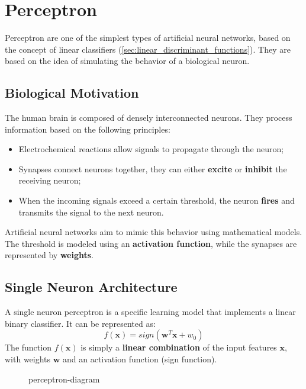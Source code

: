 \section{Perceptron}
Perceptron are one of the simplest types of artificial neural networks, based on the concept of linear classifiers (\ref{sec:linear_discriminant_functions}).
They are based on the idea of simulating the behavior of a biological neuron.
\subsection{Biological Motivation}
The human brain is composed of densely interconnected neurons. They process information based on the following principles:
\begin{itemize}
    \item Electrochemical reactions allow signals to propagate through the neuron;
    \item Synapses connect neurons together, they can either \textbf{excite} or \textbf{inhibit} the receiving neuron;
    \item When the incoming signals exceed a certain threshold, the neuron \textbf{fires} and transmits the signal to the next neuron.
\end{itemize}
Artificial neural networks aim to mimic this behavior using mathematical models. 
The threshold is modeled using an \textbf{activation function}, while the synapses are represented by \textbf{weights}.

\subsection{Single Neuron Architecture}
A single neuron perceptron is a specific learning model that implements a linear binary classifier. It can be represented as:
\begin{equation}   
    \label{eq:perceptron}
    f(\boldsymbol{x}) = sign(\boldsymbol{w}^T \boldsymbol{x} + w_0)
\end{equation}
The function $f(\boldsymbol{x})$ is simply a \textbf{linear combination} of the input features $\boldsymbol{x}$, with weights $\boldsymbol{w}$
and an activation function (sign function).
\begin{figure}[H]
    {perceptron-diagram}
\end{figure}

